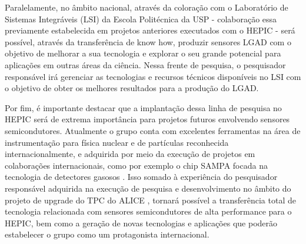 Paralelamente, no âmbito nacional, através da coloração com o Laboratório de Sistemas Integráveis (LSI) da Escola Politécnica da USP - colaboração essa previamente estabelecida em projetos anteriores executados com o HEPIC \cite{ALICEUP,ref1} - será possível, através da transferência de know how, produzir sensores LGAD com o objetivo de melhorar a sua tecnologia e explorar o seu grande potencial para aplicações em outras áreas da ciência. Nessa frente de pesquisa, o pesquisador responsável irá gerenciar as tecnologias e recursos técnicos disponíveis no LSI com o objetivo de obter os melhores resultados para a produção do LGAD.  


Por fim, é importante destacar que a implantação dessa linha de pesquisa no HEPIC será de extrema importância para projetos futuros envolvendo sensores semicondutores. Atualmente o grupo conta com excelentes ferramentas na área de instrumentação para física nuclear e de partículas reconhecida internacionalmente, e adquirida por meio da execução de projetos em colaborações internacionais, como por exemplo o chip SAMPA focada na tecnologia de detectores gasosos \cite{ref1}. Isso somado à experiência do pesquisador responsável adquirida na execução de pesquisa e desenvolvimento no âmbito do projeto de upgrade do TPC do ALICE \cite{tpcNIM,discharge_paper,GSI_REPO}, tornará possível a transferência total de tecnologia relacionada com sensores semicondutores de alta performance para o HEPIC, bem como a geração de novas tecnologias e aplicações que poderão estabelecer o grupo como um protagonista internacional.

\renewcommand{\cleardoublepage}{}
\renewcommand{\clearpage}{}